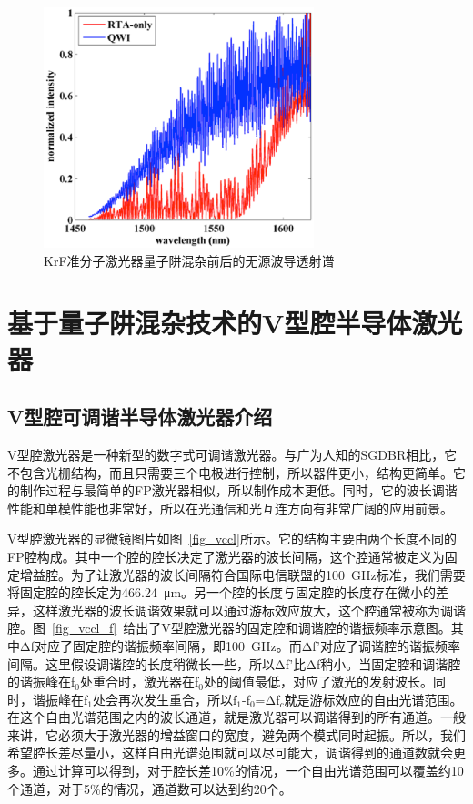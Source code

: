\documentclass{ZJUthesis}
\begin{document}
\begin{figure}[htbp]
    \centering
    \includegraphics[width=0.7\textwidth]{./Pictures/fp_loss.eps}
    \caption{KrF准分子激光器量子阱混杂前后的无源波导透射谱}
    \label{fig_fp_loss}
\end{figure}

\chapter{基于量子阱混杂技术的V型腔半导体激光器}

\section{V型腔可调谐半导体激光器介绍}

V型腔激光器是一种新型的数字式可调谐激光器。与广为人知的SGDBR相比，它不包含光栅结构，而且只需要三个电极进行控制，所以器件更小，结构更简单。它的制作过程与最简单的FP激光器相似，所以制作成本更低。同时，它的波长调谐性能和单模性能也非常好，所以在光通信和光互连方向有非常广阔的应用前景。

V型腔激光器的显微镜图片如图~\ref{fig_vccl}所示。它的结构主要由两个长度不同的FP腔构成。其中一个腔的腔长决定了激光器的波长间隔，这个腔通常被定义为固定增益腔。为了让激光器的波长间隔符合国际电信联盟的100~GHz标准，我们需要将固定腔的腔长定为466.24~μm。另一个腔的长度与固定腔的长度存在微小的差异，这样激光器的波长调谐效果就可以通过游标效应放大，这个腔通常被称为调谐腔。图~\ref{fig_vccl_f}~给出了V型腔激光器的固定腔和调谐腔的谐振频率示意图。其中Δf对应了固定腔的谐振频率间隔，即100~GHz。而Δf’对应了调谐腔的谐振频率间隔。这里假设调谐腔的长度稍微长一些，所以Δf’比Δf稍小。当固定腔和调谐腔的谐振峰在f$_0$处重合时，激光器在f$_0$处的阈值最低，对应了激光的发射波长。同时，谐振峰在f$_1$处会再次发生重合，所以f$_1$-f$_0$=Δf$_c$就是游标效应的自由光谱范围。在这个自由光谱范围之内的波长通道，就是激光器可以调谐得到的所有通道。一般来讲，它必须大于激光器的增益窗口的宽度，避免两个模式同时起振。所以，我们希望腔长差尽量小，这样自由光谱范围就可以尽可能大，调谐得到的通道数就会更多。通过计算可以得到，对于腔长差10\%的情况，一个自由光谱范围可以覆盖约10个通道，对于5\%的情况，通道数可以达到约20个。
\end{document}
